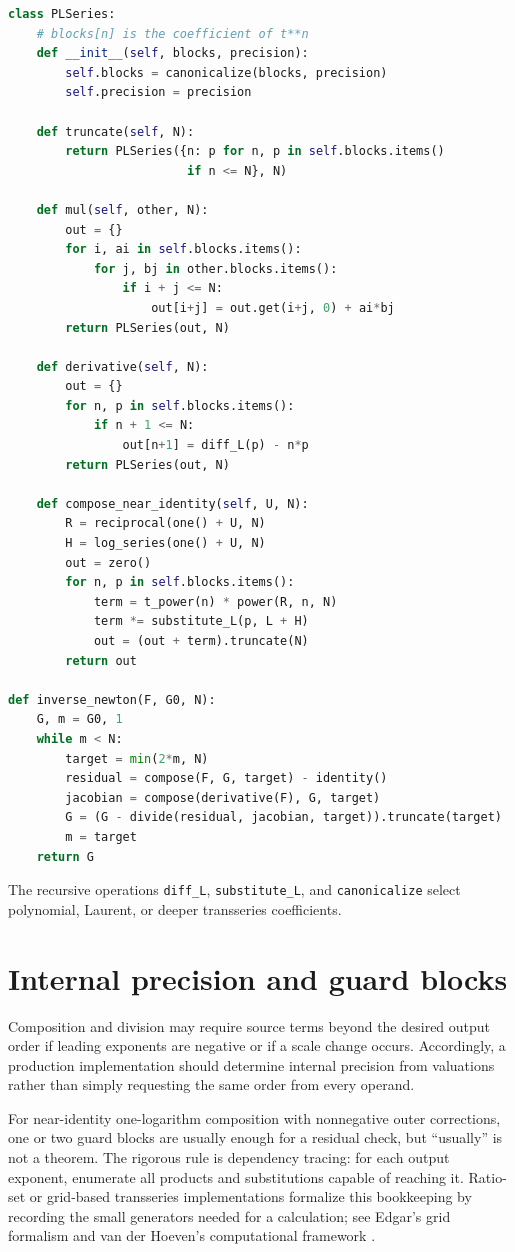 \documentclass[11pt,oneside]{book}
\theoremstyle{definition}
\theoremstyle{remark}
\begin{document}
\begin{lstlisting}[language=Python,caption={Sparse outer blocks with recursive coefficients}]
class PLSeries:
    # blocks[n] is the coefficient of t**n
    def __init__(self, blocks, precision):
        self.blocks = canonicalize(blocks, precision)
        self.precision = precision

    def truncate(self, N):
        return PLSeries({n: p for n, p in self.blocks.items()
                         if n <= N}, N)

    def mul(self, other, N):
        out = {}
        for i, ai in self.blocks.items():
            for j, bj in other.blocks.items():
                if i + j <= N:
                    out[i+j] = out.get(i+j, 0) + ai*bj
        return PLSeries(out, N)

    def derivative(self, N):
        out = {}
        for n, p in self.blocks.items():
            if n + 1 <= N:
                out[n+1] = diff_L(p) - n*p
        return PLSeries(out, N)

    def compose_near_identity(self, U, N):
        R = reciprocal(one() + U, N)
        H = log_series(one() + U, N)
        out = zero()
        for n, p in self.blocks.items():
            term = t_power(n) * power(R, n, N)
            term *= substitute_L(p, L + H)
            out = (out + term).truncate(N)
        return out

def inverse_newton(F, G0, N):
    G, m = G0, 1
    while m < N:
        target = min(2*m, N)
        residual = compose(F, G, target) - identity()
        jacobian = compose(derivative(F), G, target)
        G = (G - divide(residual, jacobian, target)).truncate(target)
        m = target
    return G
\end{lstlisting}

The recursive operations \texttt{diff\_L}, \texttt{substitute\_L},
and \texttt{canonicalize} select polynomial, Laurent, or deeper
transseries coefficients.

\section{Internal precision and guard blocks}
Composition and division may require source terms beyond the desired output
order if leading exponents are negative or if a scale change occurs.
Accordingly, a production implementation should determine internal
precision from valuations rather than simply requesting the same order from
every operand.

For near-identity one-logarithm composition with nonnegative outer
corrections, one or two guard blocks are usually enough for a residual check,
but ``usually'' is not a theorem. The rigorous rule is dependency tracing:
for each output exponent, enumerate all products and substitutions capable of
reaching it. Ratio-set or grid-based transseries implementations formalize
this bookkeeping by recording the small generators needed for a
calculation; see Edgar's grid formalism and van der Hoeven's computational
framework \cite{EdgarBeginners,vdHoeven2006}.
\end{document}
